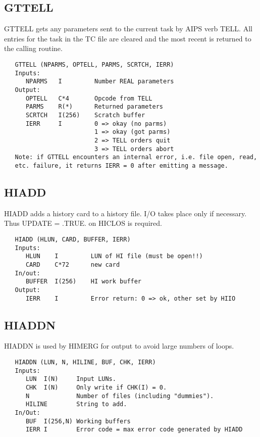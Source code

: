 \subsection{GTTELL}
GTTELL gets any parameters sent to the current task by AIPS verb
TELL.  All entries for the task in the TC file are cleared and the
most recent is returned to the calling routine.
\begin{verbatim}
   GTTELL (NPARMS, OPTELL, PARMS, SCRTCH, IERR)
   Inputs:
      NPARMS   I         Number REAL parameters
   Output:
      OPTELL   C*4       Opcode from TELL
      PARMS    R(*)      Returned parameters
      SCRTCH   I(256)    Scratch buffer
      IERR     I         0 => okay (no parms)
                         1 => okay (got parms)
                         2 => TELL orders quit
                         3 => TELL orders abort
   Note: if GTTELL encounters an internal error, i.e. file open, read,
   etc. failure, it returns IERR = 0 after emitting a message.
\end{verbatim}

\subsection{HIADD}
HIADD adds a history card to a history file.  I/O takes place only
if necessary. Thus UPDATE = .TRUE. on HICLOS is required.
\begin{verbatim}
   HIADD (HLUN, CARD, BUFFER, IERR)
   Inputs:
      HLUN    I         LUN of HI file (must be open!!)
      CARD    C*72      new card
   In/out:
      BUFFER  I(256)    HI work buffer
   Output:
      IERR    I         Error return: 0 => ok, other set by HIIO
\end{verbatim}

\subsection{HIADDN}
HIADDN is used by HIMERG for output to avoid large numbers of loops.
\begin{verbatim}
   HIADDN (LUN, N, HILINE, BUF, CHK, IERR)
   Inputs:
      LUN  I(N)     Input LUNs.
      CHK  I(N)     Only write if CHK(I) = 0.
      N             Number of files (including "dummies").
      HILINE        String to add.
   In/Out:
      BUF  I(256,N) Working buffers
      IERR I        Error code = max error code generated by HIADD
\end{verbatim}



